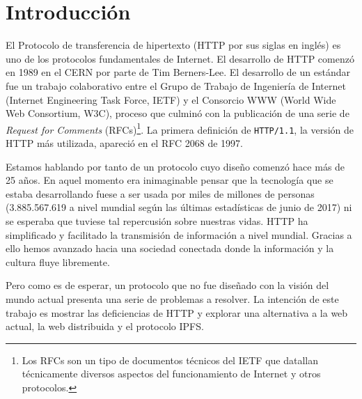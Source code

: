 \documentclass[12pt]{article} %
\begin{document}

\tableofcontents %

\newpage %


\section*{Introducción}

El Protocolo de transferencia de hipertexto (HTTP por sus siglas en inglés) es uno de los protocolos fundamentales de Internet. El desarrollo de HTTP comenzó en 1989 en el CERN por parte de Tim Berners-Lee. El desarrollo de un estándar fue un trabajo colaborativo entre el Grupo de Trabajo de Ingeniería de Internet (Internet Engineering Task Force, IETF) y el Consorcio WWW (World Wide Web Consortium, W3C), proceso que culminó con la publicación de una serie de \textit{Request for Comments} (RFCs)\footnote{Los RFCs son un tipo de documentos técnicos del IETF que datallan técnicamente diversos aspectos del funcionamiento de Internet y otros protocolos.}. La primera definición de \texttt{HTTP/1.1}, la versión de HTTP más utilizada, apareció en el RFC 2068 de 1997. 

Estamos hablando por tanto de un protocolo cuyo diseño comenzó hace más de 25 años. En aquel momento era inimaginable pensar que la tecnología que se estaba desarrollando fuese a ser usada por miles de millones de personas (3.885.567.619 a nivel mundial según las últimas estadísticas\cite{internet-world-stats} de junio de 2017) ni se esperaba que tuviese tal repercusión sobre nuestras vidas. HTTP ha simplificado y facilitado la transmisión de información a nivel mundial. Gracias a ello hemos avanzado hacia una sociedad conectada donde la información y la cultura fluye libremente.

Pero como es de esperar, un protocolo que no fue diseñado con la visión del mundo actual presenta una serie de problemas a resolver. La intención de este trabajo es mostrar las deficiencias de HTTP y explorar una alternativa a la web actual, la web distribuida y el protocolo IPFS.
\end{document}
